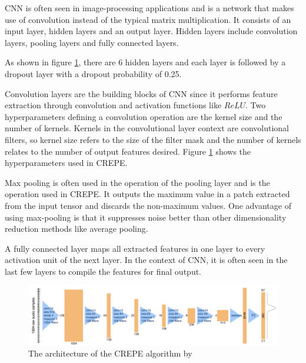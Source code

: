 \begin{enumerate}[label=\textbf{\arabic*})]
    CNN is often seen in image-processing applications and is a network that makes use of convolution instead of the typical matrix multiplication.
    It consists of an input layer, hidden layers and an output layer. Hidden layers include convolution layers, pooling layers and fully connected layers.
    
    As shown in figure \cref{CREPE}, there are 6 hidden layers and each layer is followed by a dropout layer with a dropout probability of 0.25. 

    Convolution layers are the building blocks of CNN since it performs feature extraction through convolution and activation functions like $ReLU$.
    Two hyperparameters defining a convolution operation are the kernel size and the number of kernels. Kernels in the convolutional layer context are convolutional
    filters, so kernel size refers to the size of the filter mask and the number of kernels relates to the number of output features desired. Figure \cref{CREPE} shows the hyperparameters
    used in CREPE.

    Max pooling is often used in the operation of the pooling layer and is the operation used in CREPE. It outputs the maximum value in a patch extracted from the
    input tensor and discards the non-maximum values. 
    One advantage of using max-pooling is that it suppresses noise better than other dimensionality reduction methods like average pooling.

    A fully connected layer maps all extracted features in one layer to every activation unit of the next layer. In the context of CNN, it is often seen in the
    last few layers to compile the features for final output.

    \begin{figure}
        \centering
        \includegraphics[width=0.8\columnwidth]{Figures/CREPE.png}
        \caption{The architecture of the CREPE algorithm by \cite{crepepaper}}
        \label{CREPE}
    \end{figure}

\end{enumerate}

